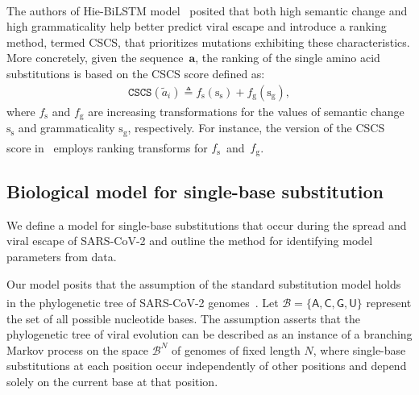 \documentclass[pdflatex,sn-nature]{sn-jnl}
\renewcommand\cite[1]{\unskip\textsuperscript{\citep{#1}}}
\begin{document}
The authors of Hie-BiLSTM model~\cite{hie2021learning} posited that both high semantic change and high grammaticality help better predict viral escape and introduce a ranking method, termed CSCS, that prioritizes mutations exhibiting these characteristics.
More concretely, given the sequence~$\mathbf{a}$, the ranking of the single amino acid substitutions is based on the CSCS score defined as:
\begin{align}
    \mathtt{CSCS}(\tilde{a}_i)
    \triangleq
    f_\text{s}(\mathrm{s}_\text{s}) + f_\text{g}(\mathrm{s}_\text{g}),
    \label{e:cscs_theory}
\end{align}
where $f_\text{s}$ and $f_\text{g}$ are increasing transformations for the values of semantic change $\mathrm{s}_\text{s}$ and grammaticality $\mathrm{s}_\text{g}$, respectively. For instance, the version of the CSCS score in~\cite{hie2021learning} employs ranking transforms for $f_\text{s}$~and~$f_\text{g}$.

\subsection*{Biological model for single-base substitution}
We define a model for single-base substitutions that occur during the spread and viral escape of SARS-CoV-2 and outline the method for identifying model parameters from data.

Our model posits that the assumption of the standard substitution model holds in the phylogenetic tree of SARS-CoV-2 genomes~\cite{felsenstein2003inferring}. Let $\mathcal{B} = \{ \mathsf{A}, \mathsf{C}, \mathsf{G}, \mathsf{U} \}$ represent the set of all possible nucleotide bases.
The assumption asserts that the phylogenetic tree of viral evolution can be described as an instance of a branching Markov process on the space $\mathcal{B}^N$ of genomes of fixed length $N$, where single-base substitutions at each position occur independently of other positions and depend solely on the current base at that position.
\end{document}
